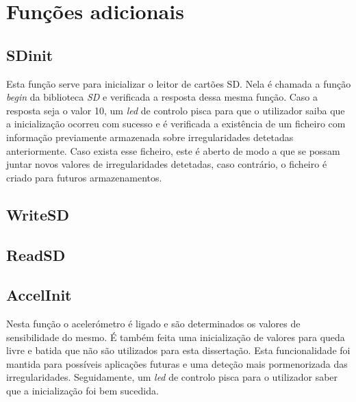 \section{Funções adicionais}
\label{sec: funcoes_adicionais}

\subsection{SD\textunderscore init}
\label{sub: sd_init}

Esta função serve para inicializar o leitor de cartões SD. Nela é chamada a função \emph{begin} da biblioteca \emph{SD} e verificada a resposta dessa mesma função. Caso a resposta seja o valor 10, um \emph{led} de controlo pisca para que o utilizador saiba que a inicialização ocorreu com sucesso e é verificada a existência de um ficheiro com informação previamente armazenada sobre irregularidades detetadas anteriormente. Caso exista esse ficheiro, este é aberto de modo a que se possam juntar novos valores de irregularidades detetadas, caso contrário, o ficheiro é criado para futuros armazenamentos.

\subsection{WriteSD}
\label{sub: writesd}

\subsection{ReadSD}
\label{sub: readsd}

\subsection{AccelInit}
\label{sub: accelInit}

Nesta função o acelerómetro é ligado e são determinados os valores de sensibilidade do mesmo. É também feita uma inicialização de valores para queda livre e batida que não são utilizados para esta dissertação. Esta funcionalidade foi mantida para possíveis aplicações futuras e uma deteção mais pormenorizada das irregularidades. Seguidamente, um \emph{led} de controlo pisca para o utilizador saber que a inicialização foi bem sucedida.